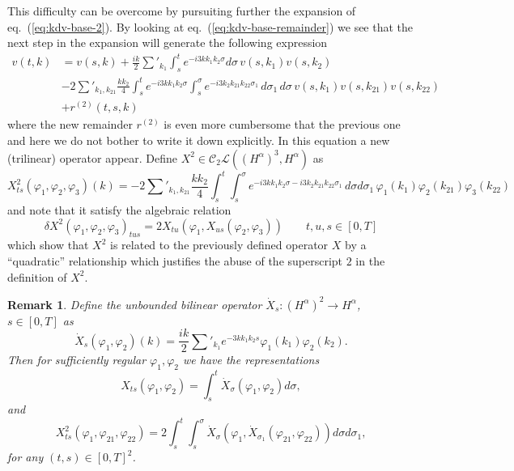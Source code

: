 \documentclass[a4paper,11pt,reqno]{article}
\newcommand{\der}{\delta}
\newcommand{\CC}{\mathcal{C}}
\newcommand{\LL}{\mathcal{L}}
\newtheorem{remark}[theorem]{Remark}
\begin{document}
This difficulty can be overcome by pursuiting further the expansion of
eq.~(\ref{eq:kdv-base-2}). By looking at
eq.~(\ref{eq:kdv-base-remainder}) we see that the next step in the
expansion will generate the following expression
\begin{equation}
  \label{eq:exp-step-2}
  \begin{split}
 v(t,k) & =   v(s,k) + \frac{ik}2 \sum'_{k_1} \int_s^t e^{-i 3 k k_1 k_2 \sigma}
  d\sigma\,  v(s,k_1)  v(s,k_2)    
\\ &   - 2 \sum'_{k_1,k_{21}}  \frac{k k_2}4  \int_s^t e^{-i 3 k k_1 k_2 \sigma}
    \int_s^\sigma
   e^{- i 3 k_2 k_{21} k_{22} \sigma_1}
 \, d\sigma_1   \, d\sigma\,  v(s,k_1)   v(s,k_{21})  v(s,k_{22})  
\\ &   + r^{(2)}(t,s,k)
  \end{split}
\end{equation}
where the new remainder $r^{(2)}$ is even more cumbersome that the
previous one and here we do not bother to write it down explicitly. In this equation a new (trilinear) operator
appear. Define $X^2 \in \CC_2 \LL((H^\alpha)^3, H^\alpha)$ as
\begin{equation}
  \label{eq:X2}
X^2_{ts}(\varphi_1,\varphi_2,\varphi_3)(k) =  
- 2 \sum'_{k_1,k_{21}}  \frac{k k_2}4  \int_s^t  \int_s^\sigma e^{-i 3
  k k_1 k_2 \sigma
- i 3 k_2 k_{21} k_{22} \sigma_1}
 \, d\sigma   d\sigma_1\,  \varphi_1(k_1)   \varphi_2(k_{21})  \varphi_3(k_{22})  
\end{equation}
and note that it satisfy the algebraic relation
\begin{equation}
  \label{eq:area-eq}
  \der X^2(\varphi_1,\varphi_2,\varphi_3)_{tus} = 2 X_{tu}(\varphi_1,X_{us}(\varphi_2,\varphi_3))
\qquad t,u,s \in [0,T]
\end{equation}
which show that $X^2$ is related to the previously defined operator
$X$ by a ``quadratic'' relationship which justifies the abuse of the superscript $2$
in the
definition of $X^2$.  



\begin{remark}
\label{rem:repr}
Define the unbounded bilinear operator $\dot X_s : (H^\alpha)^2 \to
H^\alpha$, $s\in[0,T]$ as
$$
\dot X_s(\varphi_1,\varphi_2) (k) = \frac{ik}{2}\sum'_{k_1} e^{-3k k_1 k_2
  s}\varphi_1(k_1) \varphi_2(k_2).
$$
Then for sufficiently regular $\varphi_1,\varphi_2$ we have the representations
$$
X_{ts}(\varphi_1,\varphi_2) = \int_s^t \dot
X_\sigma(\varphi_1,\varphi_2) d\sigma,
$$
and
$$
X^2_{ts}(\varphi_1,\varphi_{21},\varphi_{22}) = 2 \int_s^t \int_s^\sigma
\dot
X_\sigma(\varphi_1,\dot X_{\sigma_1}(\varphi_{21},\varphi_{22}))
d\sigma d\sigma_1,
$$
for any $(t,s) \in [0,T]^2$.
\end{remark}
\end{document}
